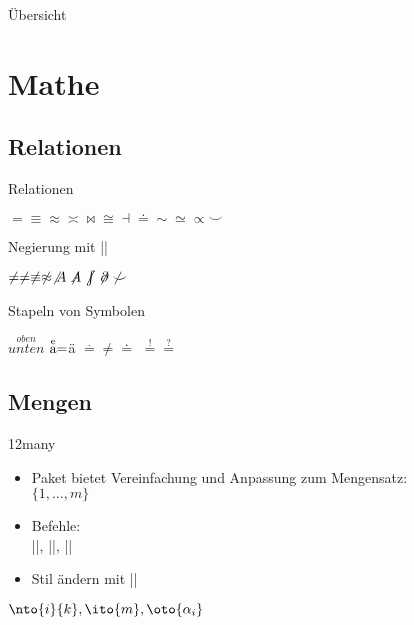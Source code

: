 \documentclass[
	vorläufig=false,
	datum=2022-11-02,
	titel={Mathematiksatz II},
	web=true,
	max,
	aspectratio=1610,
]{../tex/latexkurs-slides}
\begin{document}
\begin{frame}{Übersicht}
	\tableofcontents
\end{frame}



\section{Mathe}
\subsection{Relationen}
\begin{frame}[fragile]{Relationen}
\begin{LTXexample}
\(= \equiv \approx \asymp \bowtie \cong \dashv \doteq \sim \simeq \propto \smile\)
\end{LTXexample}
\pause Negierung mit |\not|

\begin{LTXexample} 
\(\not = \neq \not\equiv
\not \approx \not A \not\kern-.25em A
\not\kern-.2em\int \not\kern-.2em\partial \not \smile\)
\end{LTXexample}
\pause Stapeln von Symbolen

\begin{LTXexample}
\(\stackrel{oben}{unten}\)
\(\stackrel{\text e}{\text a}=\)ä
\(\stackrel . = \neq \doteq\)
\(\stackrel != \stackrel ?=\)
\end{LTXexample}
\end{frame}


\subsection{Mengen}
\begin{frame}[fragile]{12many}
\begin{itemize}
\item Paket  bietet Vereinfachung und Anpassung zum Mengensatz:\\%
\(\{1, \dots, m\}\)
\item Befehle:\\
||, ||, ||
\item Stil ändern mit ||
\end{itemize}
\begin{LTXexample}[width=.6\textwidth]
\( \nto{i}{k},
  \ito{m},
  \oto{\alpha_i} \)
\end{LTXexample}
\end{frame}
\end{document}
